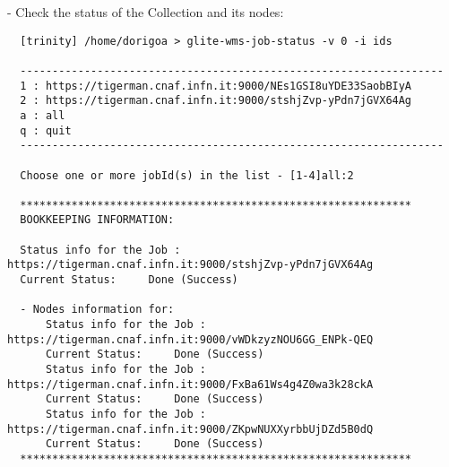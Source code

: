- Check the status of the Collection and its nodes:
\begin{scriptsize}
\begin{verbatim}
  [trinity] /home/dorigoa > glite-wms-job-status -v 0 -i ids

  ------------------------------------------------------------------
  1 : https://tigerman.cnaf.infn.it:9000/NEs1GSI8uYDE33SaobBIyA
  2 : https://tigerman.cnaf.infn.it:9000/stshjZvp-yPdn7jGVX64Ag
  a : all
  q : quit
  ------------------------------------------------------------------

  Choose one or more jobId(s) in the list - [1-4]all:2

  *************************************************************
  BOOKKEEPING INFORMATION:

  Status info for the Job : https://tigerman.cnaf.infn.it:9000/stshjZvp-yPdn7jGVX64Ag
  Current Status:     Done (Success)

  - Nodes information for: 
      Status info for the Job : https://tigerman.cnaf.infn.it:9000/vWDkzyzNOU6GG_ENPk-QEQ
      Current Status:     Done (Success)
      Status info for the Job : https://tigerman.cnaf.infn.it:9000/FxBa61Ws4g4Z0wa3k28ckA
      Current Status:     Done (Success)
      Status info for the Job : https://tigerman.cnaf.infn.it:9000/ZKpwNUXXyrbbUjDZd5B0dQ
      Current Status:     Done (Success)
  *************************************************************

\end{verbatim}
\end{scriptsize}

